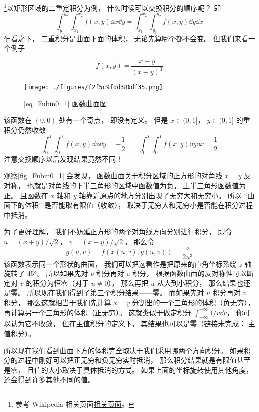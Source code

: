 

\footnote{参考 Wikipedia 相关页面\href{https://en.wikipedia.org/wiki/Fubini's_theorem}{相关页面}。}以矩形区域的二重定积分为例， 什么时候可以交换积分的顺序呢？ 即
\begin{equation}
\int_{y_1}^{y_2}\int_{x_1}^{x_2} f(x, y) \dd{x} \dd{y} = \int_{x_1}^{x_2}\int_{y_1}^{y_2} f(x, y) \dd{y}\dd{x}
\end{equation}
乍看之下， 二重积分是曲面下面的体积， 无论先算哪个都不会变。 但我们来看一个例子

\begin{example}{}\label{ex_Fubin0_1}
\begin{equation}\label{eq_Fubin0_1}
f(x, y) = \frac{x - y}{(x+y)^3}
\end{equation}
\begin{figure}[ht]
\centering
\texttt{[image: ./figures/f2f5c9fdd386df35.png]}
\caption{\autoref{eq_Fubin0_1} 函数曲面图} \label{fig_Fubin0_1}
\end{figure}
该函数在 $(0,0)$ 处有一个奇点， 即没有定义。 但是 $x \in (0, 1]$， $y \in (0, 1]$ 的重积分仍然收敛
\begin{equation}
\int_0^1 \int_0^1 f(x,y) \dd{x} \dd{y} = -\frac{1}{2}
\qquad
\int_0^1 \int_0^1 f(x,y) \dd{y} \dd{x} = \frac{1}{2}
\end{equation}
注意交换顺序以后发现结果竟然不同！

观察\autoref{fig_Fubin0_1} 会发现， 函数曲面关于积分区域的正方形的对角线 $x=y$ 反对称， 也就是对角线的下半三角形的区域中函数值为负， 上半三角形函数值为正。 且函数在 $x$ 轴和 $y$ 轴靠近原点的地方分别出现了无穷大和无穷小。 所以 “曲面下的体积” 是否能取有限值（收敛）， 取决于无穷大和无穷小是否能在积分过程中抵消。

为了更好理解， 我们不妨延正方形的两个对角线方向分别进行积分， 即令 $u = (x+y)/\sqrt{2}$， $v=(x-y)/\sqrt{2}$。 那么令
\begin{equation}
g(u,v) = f(x(u,v), y(u,v)) = \frac{v}{2u^3}
\end{equation}
该函数表示同一个形状的曲面， 我们可以把这看作是把原来的直角坐标系绕 $z$ 轴旋转了 45°。 所以如果先对 $v$ 积分再对 $u$ 积分， 根据函数曲面的反对称性可以断定对 $v$ 的积分为恒零（对于 $u\ne 0$）， 那么再把 $u$ 从大到小积分， 那么结果也还是零。 所以现在我们得到了第三个积分结果——零。 而如果先对 $u$ 积分再对 $v$ 积分， 那么这就相当于我们先计算 $x=y$ 分割出的一个三角形的体积（负无穷）， 再计算另一个三角形的体积（正无穷）。 这就类似于做定积分 $\int_{-\infty}^{+\infty}1/v\dd{v}$， 你可以认为它不收敛， 但在主值积分的定义下， 其结果也可以是零（链接未完成： 主值积分）。

所以现在我们看到曲面下方的体积完全取决于我们采用哪两个方向积分。 如果积分的过程中刚好可以把正无穷和负无穷实时抵消， 那么积分结果就是有限值甚至是零， 且值的大小取决于具体抵消的方式。 如果上面的坐标旋转使用其他角度， 还会得到许多其他不同的值。
\end{example}


